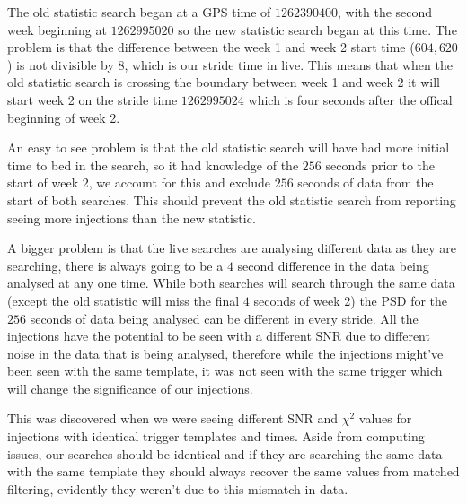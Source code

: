 The old statistic search began at a GPS time of $1262390400$, with the second week beginning at $1262995020$ so the new statistic search began at this time. The problem is that the difference between the week 1 and week 2 start time ($604,620$) is not divisible by $8$, which is our stride time in live. This means that when the old statistic search is crossing the boundary between week 1 and week 2 it will start week 2 on the stride time $1262995024$ which is four seconds after the offical beginning of week 2.

An easy to see problem is that the old statistic search will have had more initial time to bed in the search, so it had knowledge of the $256$ seconds prior to the start of week 2, we account for this and exclude $256$ seconds of data from the start of both searches. This should prevent the old statistic search from reporting seeing more injections than the new statistic.

A bigger problem is that the live searches are analysing different data as they are searching, there is always going to be a $4$ second difference in the data being analysed at any one time. While both searches will search through the same data (except the old statistic will miss the final $4$ seconds of week 2) the PSD for the $256$ seconds of data being analysed can be different in every stride. All the injections have the potential to be seen with a different SNR due to different noise in the data that is being analysed, therefore while the injections might've been seen with the same template, it was not seen with the same trigger which will change the significance of our injections.

This was discovered when we were seeing different SNR and $\chi^{2}$ values for injections with identical trigger templates and times. Aside from computing issues, our searches should be identical and if they are searching the same data with the same template they should always recover the same values from matched filtering, evidently they weren't due to this mismatch in data.

